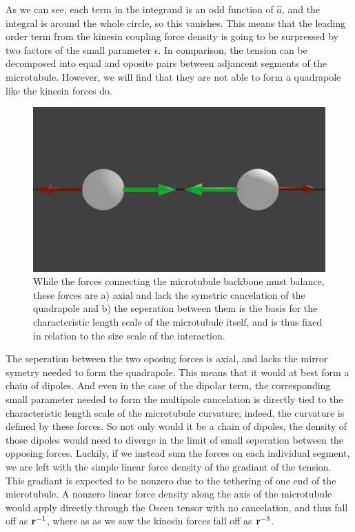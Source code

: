 \documentclass[11pt]{ucthesis}
\def\br{{\bf r}}
\begin{document}
{As we can see, each term in the integrand is an odd function of $\hat{a}$, and the integral is around the whole circle, so this vanishes. 
This means that the leading order term from the kinesin coupling force density is going to be surpressed by two factors of the small parameter $\epsilon$.
In comparison, the tension can be decomposed into equal and oposite pairs between adjancent segments of the microtubule. However, we will find that they are not able to form a quadrapole like the kinesin forces do.
\begin{figure}[htp]
\begin{center}
\includegraphics[width=\hsize]{tenbal.png}
\caption{ 
While the forces connecting the microtubule backbone must balance, these forces are a) axial and lack the symetric cancelation of the quadrapole and b) the seperation between them is the basis for the characteristic length scale of the microtubule itself, and is thus fixed in relation to the size scale of the interaction.
}
\label{fig:quadforce}
\end{center}
\end{figure}
The seperation between the two oposing forces is axial, and lacks the mirror symetry needed to form the quadrapole. This means that it would at best form a chain of dipoles. 
And even in the case of the dipolar term,  the corresponding small parameter needed to form the multipole cancelation is directly tied to the characteristic length scale of the microtubule curvature; indeed, the curvature is defined by these forces. 
So not only would it be a chain of dipoles, the density of those dipoles would need to diverge in the limit of small seperation between the opposing forces.
Luckily, if we instead sum the forces on each individual segment, we are left with the simple linear force density of the gradiant of the tension. This gradiant is expected to be nonzero due to the tethering of one end of the microtubule.
A nonzero linear force density along the axis of the microtubule would apply directly through the Oseen tensor with no cancelation, and thus fall off as $\br^{-1}$, where as as we saw the kinesin forces fall off as $\br^{-3}$.
 
}
\end{document}
